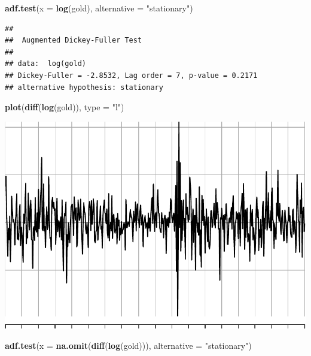 \documentclass[
]{article}
\newenvironment{Shaded}{\begin{snugshade}}{\end{snugshade}}
\newcommand{\AttributeTok}[1]{\textcolor[rgb]{0.13,0.29,0.53}{#1}}
\newcommand{\FunctionTok}[1]{\textcolor[rgb]{0.13,0.29,0.53}{\textbf{#1}}}
\newcommand{\NormalTok}[1]{#1}
\newcommand{\StringTok}[1]{\textcolor[rgb]{0.31,0.60,0.02}{#1}}
\begin{document}
\begin{Shaded}
\begin{Highlighting}[]
\FunctionTok{adf.test}\NormalTok{(}\AttributeTok{x =} \FunctionTok{log}\NormalTok{(gold),}
         \AttributeTok{alternative =} \StringTok{"stationary"}\NormalTok{)}
\end{Highlighting}
\end{Shaded}

\begin{verbatim}
## 
##  Augmented Dickey-Fuller Test
## 
## data:  log(gold)
## Dickey-Fuller = -2.8532, Lag order = 7, p-value = 0.2171
## alternative hypothesis: stationary
\end{verbatim}

\begin{Shaded}
\begin{Highlighting}[]
\FunctionTok{plot}\NormalTok{(}\FunctionTok{diff}\NormalTok{(}\FunctionTok{log}\NormalTok{(gold)), }\AttributeTok{type =} \StringTok{"l"}\NormalTok{)}
\end{Highlighting}
\end{Shaded}

\begin{center}\includegraphics[width=0.8\linewidth]{Timeseries_Analysis_HW4_files/figure-latex/unnamed-chunk-12-3} \end{center}

\begin{Shaded}
\begin{Highlighting}[]
\FunctionTok{adf.test}\NormalTok{(}\AttributeTok{x =} \FunctionTok{na.omit}\NormalTok{(}\FunctionTok{diff}\NormalTok{(}\FunctionTok{log}\NormalTok{(gold))),}
         \AttributeTok{alternative =} \StringTok{"stationary"}\NormalTok{)}
\end{Highlighting}
\end{Shaded}
\end{document}

